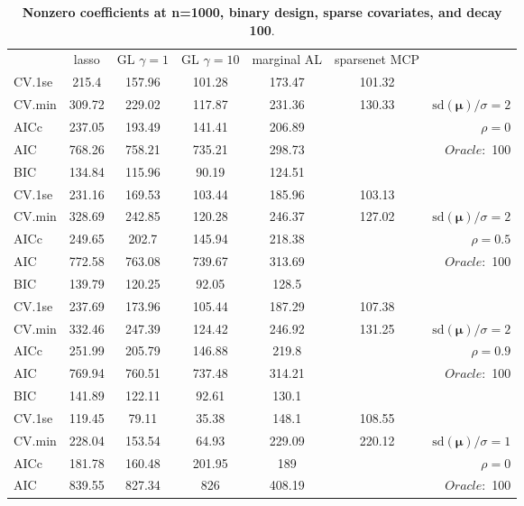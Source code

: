 \begin{table}\vspace{-.5cm}
\caption[l]{ { \bf Nonzero coefficients at n=1000, binary design, 
sparse covariates, and  decay  100}.}
\vspace{-.5cm}
\footnotesize{}
\begin{center}
\begin{tabular}{l*{5}{c}|r}
& lasso & GL $\gamma=1$ & GL $\gamma=10$ & marginal AL & sparsenet MCP  & \\
 \cline{1-7}
CV.1se & 215.4 & 157.96 & 101.28 & 173.47 & 101.32 & \\
CV.min & 309.72 & 229.02 & 117.87 & 231.36 & 130.33 &  $\mathrm{sd}(\mathbf{\mu})/\sigma=2$ \\
AICc & 237.05 & 193.49 & 141.41 & 206.89 & & $\rho=0$ \\
AIC & 768.26 & 758.21 & 735.21 & 298.73 & &  \multirow{2}{*}{$Oracle: $ 100} \\
BIC & 134.84 & 115.96 & 90.19 & 124.51 & &  \\
 \hline 
CV.1se & 231.16 & 169.53 & 103.44 & 185.96 & 103.13 & \\
CV.min & 328.69 & 242.85 & 120.28 & 246.37 & 127.02 &  $\mathrm{sd}(\mathbf{\mu})/\sigma=2$ \\
AICc & 249.65 & 202.7 & 145.94 & 218.38 & & $\rho=0.5$ \\
AIC & 772.58 & 763.08 & 739.67 & 313.69 & &  \multirow{2}{*}{$Oracle: $ 100} \\
BIC & 139.79 & 120.25 & 92.05 & 128.5 & &  \\
 \hline 
CV.1se & 237.69 & 173.96 & 105.44 & 187.29 & 107.38 & \\
CV.min & 332.46 & 247.39 & 124.42 & 246.92 & 131.25 &  $\mathrm{sd}(\mathbf{\mu})/\sigma=2$ \\
AICc & 251.99 & 205.79 & 146.88 & 219.8 & & $\rho=0.9$ \\
AIC & 769.94 & 760.51 & 737.48 & 314.21 & &  \multirow{2}{*}{$Oracle: $ 100} \\
BIC & 141.89 & 122.11 & 92.61 & 130.1 & &  \\
 \hline 
CV.1se & 119.45 & 79.11 & 35.38 & 148.1 & 108.55 & \\
CV.min & 228.04 & 153.54 & 64.93 & 229.09 & 220.12 &  $\mathrm{sd}(\mathbf{\mu})/\sigma=1$ \\
AICc & 181.78 & 160.48 & 201.95 & 189 & & $\rho=0$ \\
AIC & 839.55 & 827.34 & 826 & 408.19 & &  \multirow{2}{*}{$Oracle: $ 100} \\

\end{tabular}
\end{center}
\end{table}

